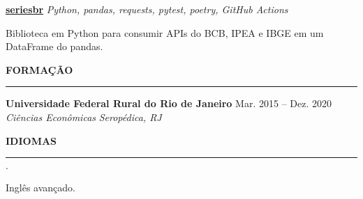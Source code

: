 \documentclass[11pt,letterpaper]{article}
\newenvironment{tightlist}
  {\begin{list}
    {$\cdot$}
    {
      \setlength{\leftmargin}{0em}
      \setlength{\itemsep}{-\smallskipamount}
    }
  }
{\end{list}}
\begin{document}
\smallskip

\textbf{\href{https://github.com/phelipetls/seriesbr}{seriesbr}} \hfill \emph{Python, pandas, requests, pytest, poetry, GitHub Actions}
{\parfillskip=0pt\par}
Biblioteca em Python para consumir APIs do BCB, IPEA e IBGE em um DataFrame do pandas.

\medskip \textbf{FORMAÇÃO} \medskip
\hrule

\textbf{Universidade Federal Rural do Rio de Janeiro} \hfill {Mar. 2015 -- Dez. 2020} \\
\emph{Ciências Econômicas} \hfill \emph{Seropédica, RJ} {\parfillskip=0pt\par}

\medskip \textbf{IDIOMAS} \medskip
\hrule

\begin{tightlist}
  \item Inglês avançado.
\end{tightlist}
\end{document}
